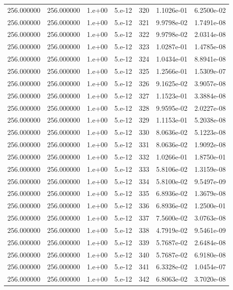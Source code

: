 \begin{table}[htbp]
\begin{tabular}{rrrrrrr}
256.000000 & 256.000000 & 1.e+00 & 5.e-12 & 320 & 1.1026e-01 & 6.2500e-02 \\
256.000000 & 256.000000 & 1.e+00 & 5.e-12 & 321 & 9.9798e-02 & 1.7491e-08 \\
256.000000 & 256.000000 & 1.e+00 & 5.e-12 & 322 & 9.9798e-02 & 2.0314e-08 \\
256.000000 & 256.000000 & 1.e+00 & 5.e-12 & 323 & 1.0287e-01 & 1.4785e-08 \\
256.000000 & 256.000000 & 1.e+00 & 5.e-12 & 324 & 1.0434e-01 & 8.8941e-08 \\
256.000000 & 256.000000 & 1.e+00 & 5.e-12 & 325 & 1.2566e-01 & 1.5309e-07 \\
256.000000 & 256.000000 & 1.e+00 & 5.e-12 & 326 & 9.1625e-02 & 3.9057e-08 \\
256.000000 & 256.000000 & 1.e+00 & 5.e-12 & 327 & 1.1523e-01 & 3.3884e-08 \\
256.000000 & 256.000000 & 1.e+00 & 5.e-12 & 328 & 9.9595e-02 & 2.0227e-08 \\
256.000000 & 256.000000 & 1.e+00 & 5.e-12 & 329 & 1.1153e-01 & 5.2038e-08 \\
256.000000 & 256.000000 & 1.e+00 & 5.e-12 & 330 & 8.0636e-02 & 5.1223e-08 \\
256.000000 & 256.000000 & 1.e+00 & 5.e-12 & 331 & 8.0636e-02 & 1.9092e-08 \\
256.000000 & 256.000000 & 1.e+00 & 5.e-12 & 332 & 1.0266e-01 & 1.8750e-01 \\
256.000000 & 256.000000 & 1.e+00 & 5.e-12 & 333 & 5.8106e-02 & 1.3159e-08 \\
256.000000 & 256.000000 & 1.e+00 & 5.e-12 & 334 & 5.8100e-02 & 9.5497e-09 \\
256.000000 & 256.000000 & 1.e+00 & 5.e-12 & 335 & 6.8936e-02 & 1.3679e-08 \\
256.000000 & 256.000000 & 1.e+00 & 5.e-12 & 336 & 6.8936e-02 & 1.2500e-01 \\
256.000000 & 256.000000 & 1.e+00 & 5.e-12 & 337 & 7.5600e-02 & 3.0763e-08 \\
256.000000 & 256.000000 & 1.e+00 & 5.e-12 & 338 & 4.7919e-02 & 9.5461e-09 \\
256.000000 & 256.000000 & 1.e+00 & 5.e-12 & 339 & 5.7687e-02 & 2.6484e-08 \\
256.000000 & 256.000000 & 1.e+00 & 5.e-12 & 340 & 5.7687e-02 & 6.9180e-08 \\
256.000000 & 256.000000 & 1.e+00 & 5.e-12 & 341 & 6.3328e-02 & 1.0454e-07 \\
256.000000 & 256.000000 & 1.e+00 & 5.e-12 & 342 & 6.8063e-02 & 3.7020e-08 \\

\end{tabular}
\end{table}

